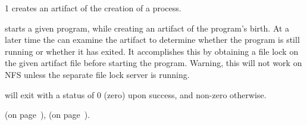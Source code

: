 \begin{ManPage}{\label{man-flock-midwife}}{1}
{creates an artifact of the creation of a process.}

\Synopsis {}


\Description {} starts a given program, while
creating an artifact of the program's birth.  At a later time the
 can examine the artifact to determine whether
the program is still running or whether it has exited.  It
accomplishes this by obtaining a file lock on the given artifact file
before starting the program.  Warning, this will not work on NFS
unless the separate file lock server is running.

\begin{Options}
\end{Options}

\ExitStatus
{} will exit with a status of 0 (zero) upon
success, and non-zero otherwise.

\SeeAlso
{} (on page~\pageref{man-uniq-pid-midwife}),
 (on page~\pageref{man-flock-undertaker}).

\end{ManPage}
